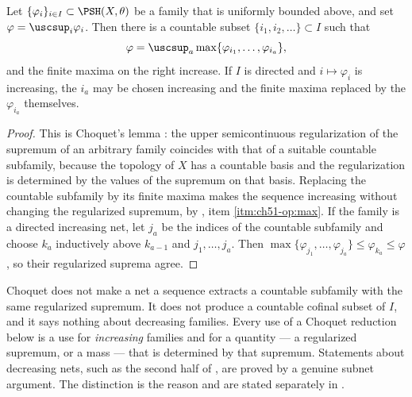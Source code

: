 \par\noindent\begin{minipage}{\textwidth}
\begin{corollary}\label{cor:ch51-choquet}
Let $\{\varphi_i\}_{i\in I}\subset\PSH(X,\theta)$ be a family that is
uniformly bounded above, and set $\varphi=\uscsup_i\varphi_i$.  Then
there is a countable subset $\{i_1,i_2,\ldots\}\subset I$ such that
\[
 \varphi=\uscsup_a\max\{\varphi_{i_1},\ldots,\varphi_{i_a}\},
\]
and the finite maxima on the right increase.  If $I$ is directed and
$i\mapsto\varphi_i$ is increasing, the $i_a$ may be chosen increasing
and the finite maxima replaced by the $\varphi_{i_a}$ themselves.
\end{corollary}
\end{minipage}\par\medskip

\begin{proof}
This is Choquet's lemma \cite{DemBook}: the upper
semicontinuous regularization of the supremum of an arbitrary family
coincides with that of a suitable countable subfamily, because the
topology of $X$ has a countable basis and the regularization is
determined by the values of the supremum on that basis.  Replacing the
countable subfamily by its finite maxima makes the sequence increasing
without changing the regularized supremum, by
, item \cref{itm:ch51-op:max}.  If the
family is a directed increasing net, let $j_a$ be the indices of the
countable subfamily and choose $k_a$ inductively above $k_{a-1}$ and
$j_1,\ldots,j_a$.  Then
$\max\{\varphi_{j_1},\ldots,\varphi_{j_a}\}\leq\varphi_{k_a}\leq\varphi$,
so their regularized suprema agree.
\end{proof}

\begin{warning}{Choquet does not make a net a sequence}
\label{warn:ch51-choquet}
 extracts a countable subfamily with the same
regularized supremum.  It does not produce a countable cofinal subset of
$I$, and it says nothing about decreasing families.  Every use of a
Choquet reduction below is a use for \emph{increasing} families and for a
quantity --- a regularized supremum, or a mass --- that is determined by
that supremum.  Statements about decreasing nets, such as the second half
of , are proved by a genuine subnet
argument.  The distinction is the reason
 and
 are stated separately in
.
\end{warning}

